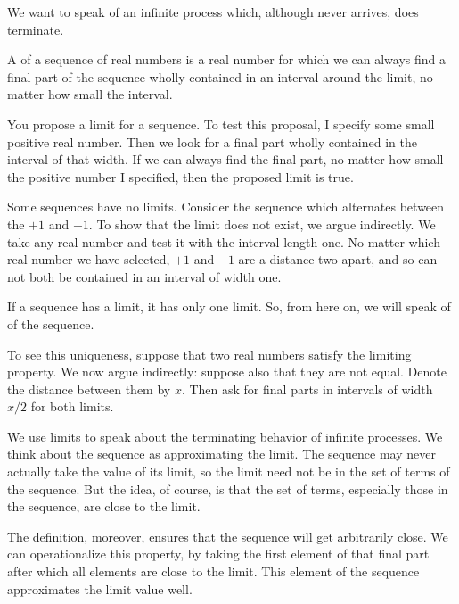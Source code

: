 

We want to speak of an
infinite process which,
although never arrives,
does terminate.


A 
of a sequence of real
numbers is a real number
for which we can always
find a final part of the
sequence wholly contained
in an interval around the limit,
no matter how small the interval.

You propose a limit
for a sequence.
To test this proposal,
I specify some small
positive real number.
Then we look for a
final part wholly contained
in the interval of that
width.
If we can always find the
final part, no matter
how small the positive
number I specified,
then the proposed limit
is true.


Some sequences have no
limits.
Consider the sequence
which alternates between
the $+1$
and $-1$.
To show that the limit
does not exist, we
argue indirectly.
We take any real
number and test it
with the interval length
one.
No matter which
real number we have
selected,
$+1$ and
$-1$ are a
distance two apart,
and so can not
both be contained
in an interval
of width one.


If a sequence has a limit,
it has only one limit.
So, from here on, we will speak
of  of
the sequence.

To see this uniqueness,
suppose that two
real numbers satisfy the
limiting property.
We now argue indirectly:
suppose also that they are
not equal.
Denote the distance between
them by $x$.
Then ask for final parts
in intervals of width $x/2$
for both limits.


We use limits to speak about
the terminating behavior of
infinite processes.
We think about the sequence
as approximating the limit.
The sequence may never
actually take the value
of its limit, so the
limit need not be in the
set of terms of the sequence.
But the idea, of course, is that the set of terms, especially those  in the sequence, are close to the limit.

The definition, moreover,
ensures that the sequence
will get arbitrarily close.
We can operationalize this
property, by taking the first
element of that final part
after which all elements are
close to the limit.
This element of the sequence approximates the limit value well.

